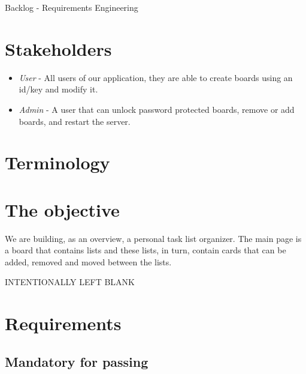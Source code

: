 \documentclass{article}
\begin{document}
	\vfill

	\begin{center}
		\Large{Backlog - Requirements Engineering}
	\end{center}

	\section{Stakeholders}

	\begin{itemize}
		\item \emph{User} - All users of our application, they are able to create boards using an id/key and modify it.
		\item \emph{Admin} - A user that can unlock password protected boards, remove or add boards, and restart the server.
	\end{itemize}

	\section{Terminology}
	\vspace{-0.5cm}
	\printglossary[title={}]

	\section{The objective}

	We are building, as an overview, a personal task list organizer. The main page is a board that contains lists and these lists, in turn, contain cards that can be added, removed and moved between the lists.

	\vfill
	\begin{center} \LARGE \textcolor{black!50!red!50!white}{\scshape INTENTIONALLY LEFT BLANK} \end{center}
	\vfill


	\clearpage

	\section{Requirements}

	\subsection{Mandatory for passing}
\end{document}
